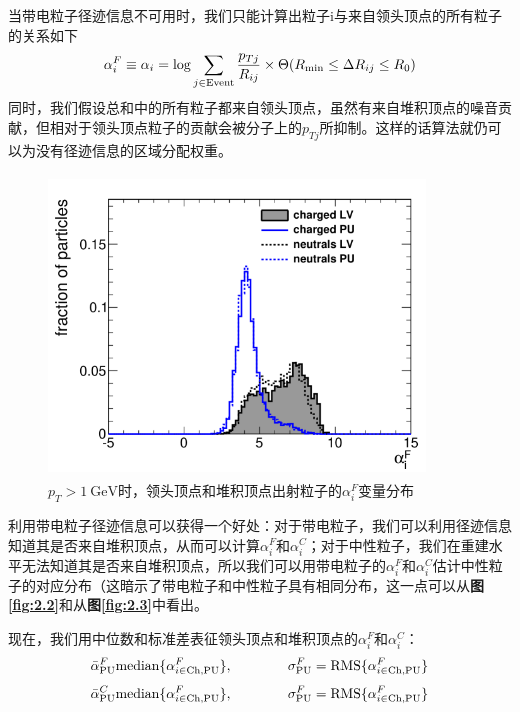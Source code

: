 当带电粒子径迹信息不可用时，我们只能计算出粒子i与来自领头顶点的所有粒子的关系如下
\begin{equation}
    \alpha^F_{i}\equiv\alpha_{i}=\log\sum_{\begin{subarray}{c}j\in{\text{Event}}\end{subarray}}\frac{p_{Tj}}{R_{ij}}\times\Theta(R_{\text{min}}\leq\Delta R_{ij}\leq R_{0})
\end{equation}
同时，我们假设总和中的所有粒子都来自领头顶点，虽然有来自堆积顶点的噪音贡献，但相对于领头顶点粒子的贡献会被分子上的$p_{Tj}$所抑制。这样的话算法就仍可以为没有径迹信息的区域分配权重。

\begin{figure}[H]
 \centering\label{fig:3.3}
 \caption{$p_{T}>1~{}\mathrm{GeV}$时，领头顶点和堆积顶点出射粒子的$\alpha^F_i$变量分布\cite{Pileup_Per_Particle_Identification}}
 \includegraphics[height=8cm, width=10cm]{pictures/puppi_aF.png}
\end{figure}

利用带电粒子径迹信息可以获得一个好处：对于带电粒子，我们可以利用径迹信息知道其是否来自堆积顶点，从而可以计算$\alpha^F_i$和$\alpha_i^C$；对于中性粒子，我们在重建水平无法知道其是否来自堆积顶点，所以我们可以用带电粒子的$\alpha^F_i$和$\alpha_i^C$估计中性粒子的对应分布（这暗示了带电粒子和中性粒子具有相同分布，这一点可以从\textbf{图\ref{fig:2.2}}和从\textbf{图\ref{fig:2.3}}中看出。

现在，我们用中位数和标准差表征领头顶点和堆积顶点的$\alpha^F_i$和$\alpha_i^C$：
\begin{equation}
    \bar{\alpha}^{F}_{\text{PU}}\text{median}\{\alpha^{F}_{i\in\text{Ch,PU}}\},\hskip 40.00006pt\sigma^{F}_{\text{PU}}=\text{RMS}\{\alpha^{F}_{i\in\text{Ch,PU}}\}
\end{equation}
\begin{equation}
    \bar{\alpha}^{C}_{\text{PU}}\text{median}\{\alpha^{F}_{i\in\text{Ch,PU}}\},\hskip 40.00006pt\sigma^{F}_{\text{PU}}=\text{RMS}\{\alpha^{F}_{i\in\text{Ch,PU}}\}
\end{equation}


